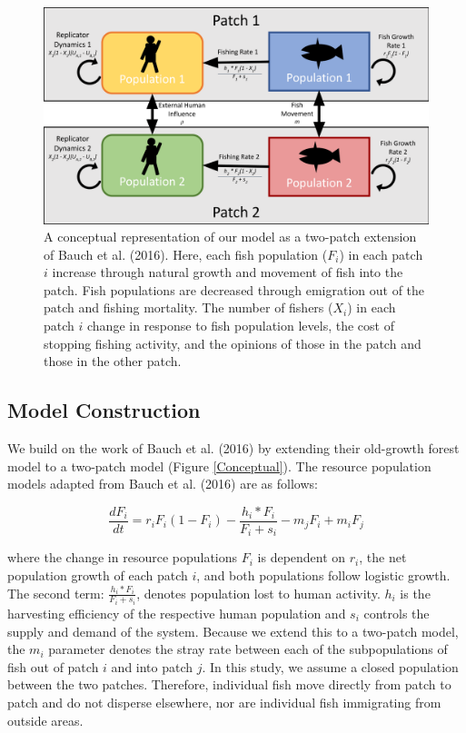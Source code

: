 \documentclass[
  12pt,
]{article}
\begin{document}
\begin{figure}
\includegraphics[width=1\linewidth]{CoupledModelConceptual} \caption{A conceptual representation of our model as a two-patch extension of Bauch et al. (2016). Here, each fish population (\(F_i\)) in each patch \(i\) increase through natural growth and movement of fish into the patch. Fish populations are decreased through emigration out of the patch and fishing mortality. The number of fishers (\(X_i\)) in each patch \(i\) change in response to fish population levels, the cost of stopping fishing activity, and the opinions of those in the patch and those in the other patch. \label{Conceptual}}\label{fig:Conceptual}
\end{figure}



\subsection{Model Construction}\label{model-construction}

We build on the work of Bauch et al. (2016) by extending their old-growth forest model to a two-patch model (Figure \ref{Conceptual}). The resource population models adapted from Bauch et al. (2016) are as follows:

\begin{equation} 
  \frac{dF_i}{dt} = r_iF_i(1-F_i)-\frac{h_i*F_i}{F_i + s_i} - m_jF_i + m_iF_j
  \label{eq:fish1}
\end{equation}

where the change in resource populations \(F_i\) is dependent on \(r_i\), the net population growth of each patch \(i\), and both populations follow logistic growth. The second term: \(\frac{h_i*F_i}{F_i + s_i}\), denotes population lost to human activity. \(h_i\) is the harvesting efficiency of the respective human population and \(s_i\) controls the supply and demand of the system. Because we extend this to a two-patch model, the \(m_i\) parameter denotes the stray rate between each of the subpopulations of fish out of patch \(i\) and into patch \(j\). In this study, we assume a closed population between the two patches. Therefore, individual fish move directly from patch to patch and do not disperse elsewhere, nor are individual fish immigrating from outside areas.
\end{document}
